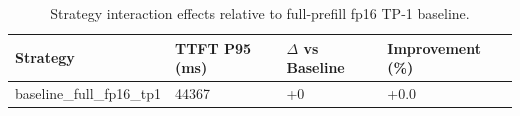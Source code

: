 \begin{table}
\caption{Strategy interaction effects relative to full-prefill fp16 TP-1 baseline.}
\label{tab:interactions}
\begin{tabular}{llll}
\toprule
Strategy & TTFT P95 (ms) & $\Delta$ vs Baseline & Improvement (\%) \\
\midrule
baseline\_full\_fp16\_tp1 & 44367 & +0 & +0.0 \\
\bottomrule
\end{tabular}
\end{table}
